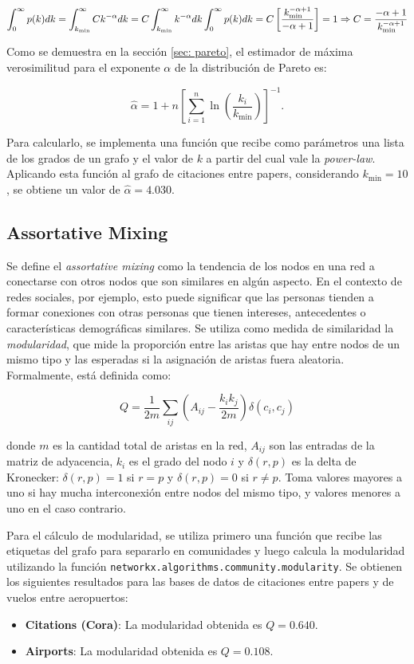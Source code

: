 \documentclass{article}
\begin{document}
$$
    \int_{0}^{\infty} p(k) dk = \int_{k_{\text{min}}}^{\infty} C k^{-\alpha} dk = C \int_{k_{\text{min}}}^{\infty} k^{-\alpha}dk \\
    \int_{0}^{\infty} p(k) dk = C \left[ \frac{k_{\text{min}}^{-\alpha+1}}{-\alpha+1} \right] = 1 \\
    \Rightarrow C = \frac{-\alpha+1}{k_{\text{min}}^{-\alpha+1}}
$$


Como se demuestra en la sección \ref{sec: pareto}, el estimador de máxima verosimilitud para el exponente $\alpha$ de la distribución de Pareto es:

$$
    \hat{\alpha} = 1 + n \left[ \sum_{i=1}^{n} \ln\left(\frac{k_i}{k_{\text{min}}}\right) \right]^{-1}.
$$


Para calcularlo, se implementa una función que recibe como parámetros una lista de los grados de un grafo y el valor de $k$ a partir del cual vale la \textit{power-law}. Aplicando esta función al grafo de citaciones entre papers, considerando $k_{\text{min}} = 10$, se obtiene un valor de $\hat{\alpha} = 4.030$.

\subsection{Assortative Mixing}

Se define el \textit{assortative mixing} como la tendencia de los nodos en una red a conectarse con otros nodos que son similares en algún aspecto. En el contexto de redes sociales, por ejemplo, esto puede significar que las personas tienden a formar conexiones con otras personas que tienen intereses, antecedentes o características demográficas similares. Se utiliza como medida de similaridad la \textit{modularidad}, que mide la proporción entre las aristas que hay entre nodos de un mismo tipo y las esperadas si la asignación de aristas fuera aleatoria. Formalmente, está definida como:

$$Q = \frac{1}{2m} \sum_{ij} \left(A_{ij} -\frac{k_ik_j}{2m} \right)\delta(c_i,c_j)$$

donde $m$ es la cantidad total de aristas en la red, $A_{ij}$ son las entradas de la matriz de adyacencia, $k_i$ es el grado del nodo $i$ y $\delta(r,p)$ es la delta de Kronecker: $\delta(r,p) = 1$ si $r=p$ y $\delta(r,p) = 0$ si $r\neq p$. Toma valores mayores a uno si hay mucha interconexión entre nodos del mismo tipo, y valores menores a uno en el caso contrario.


Para el cálculo de modularidad, se utiliza primero una función que recibe las etiquetas del grafo para separarlo en comunidades y luego calcula la modularidad utilizando la función \verb|networkx.algorithms.community.modularity|. Se obtienen los siguientes resultados para las bases de datos de citaciones entre papers y de vuelos entre aeropuertos:
\begin{itemize}
    \item \textbf{Citations (Cora)}: La modularidad obtenida es $Q = 0.640$.
    \item \textbf{Airports}: La modularidad obtenida es $Q = 0.108$.
\end{itemize}
\end{document}
